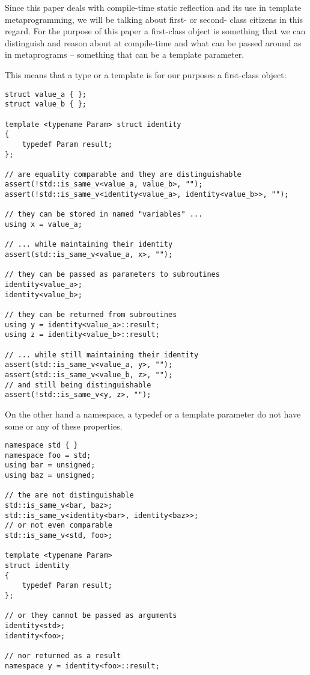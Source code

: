 Since this paper deals with compile-time static reflection and its use
in template metaprogramming, we will be talking about first- or second- class
citizens in this regard. 
For the purpose of this paper a first-class object is something that
we can distinguish and reason about at compile-time and what can be passed around
as  in metaprograms -- something that can be a template parameter.

This means that a type or a template is for our purposes a first-class object:

\begin{verbatim}
struct value_a { };
struct value_b { };

template <typename Param> struct identity
{
	typedef Param result;
};

// are equality comparable and they are distinguishable
assert(!std::is_same_v<value_a, value_b>, "");
assert(!std::is_same_v<identity<value_a>, identity<value_b>>, "");

// they can be stored in named "variables" ...
using x = value_a;

// ... while maintaining their identity
assert(std::is_same_v<value_a, x>, "");

// they can be passed as parameters to subroutines
identity<value_a>;
identity<value_b>;

// they can be returned from subroutines
using y = identity<value_a>::result;
using z = identity<value_b>::result;

// ... while still maintaining their identity
assert(std::is_same_v<value_a, y>, "");
assert(std::is_same_v<value_b, z>, "");
// and still being distinguishable
assert(!std::is_same_v<y, z>, "");
\end{verbatim}


On the other hand a namespace, a typedef or a template parameter do not have
some or any of these properties.

\begin{verbatim}
namespace std { }
namespace foo = std;
using bar = unsigned;
using baz = unsigned;

// the are not distinguishable
std::is_same_v<bar, baz>;
std::is_same_v<identity<bar>, identity<baz>>;
// or not even comparable
std::is_same_v<std, foo>;

template <typename Param>
struct identity
{
	typedef Param result;
};

// or they cannot be passed as arguments
identity<std>;
identity<foo>;

// nor returned as a result
namespace y = identity<foo>::result;
\end{verbatim}


